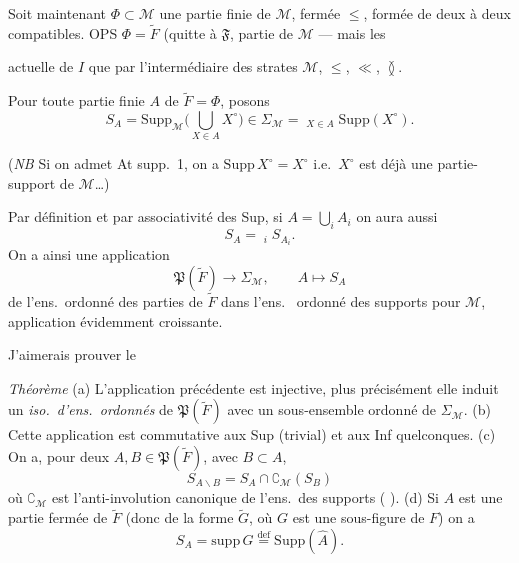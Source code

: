 \documentclass[11pt,a4paper]{article}
\begin{document}
 Soit maintenant $\Phi \subset \mathcal{M}$ \struck{\ill{}} une partie finie de $\mathcal{M}$, fermée  $\leq$, formée de   deux à deux compatibles. OPS $\Phi = \widetilde{F}$ (quitte à \struck{\ill{}} \ill{} $\mathfrak{F}$, \ill{} \ill{} partie de $\mathcal{M}$ — mais les

 \ill{} actuelle \ill{}  de $I$ que par l'intermédiaire des strates $\mathcal{M}$, $\leq$, $\ll$, $\between$. 

Pour toute partie finie $A$ de $\widetilde{F} = \Phi$, posons
\[
  S_A = \mathrm{Supp}_{\mathcal{M}} \Big( \bigcup_{X \in A} X^{\circ} \Big) \in \Sigma_{\mathcal{M}}
  = \mathop{\mathrm{Sup}_{\Sigma_{\mathcal{M}}}}_{X \in A} \mathrm{Supp}(X^{\circ}) .
\]

(\emph{NB} Si on admet At supp.\ 1, on a $\mathrm{Supp}\, X^{\circ} = X^{\circ}$ i.e.\ $X^{\circ}$ est déjà une partie-support de $\mathcal{M}$\ldots)

Par définition et par associativité des Sup, si $A = \bigcup_i A_i$ on aura aussi
\[
  S_A = \mathop{\mathrm{Sup}_{\Sigma_{\mathcal{M}}}}_{i} S_{A_i} .
\]
On a ainsi une application
\[
  \mathfrak{P}(\widetilde{F}) \longrightarrow \Sigma_{\mathcal{M}} , \qquad A \longmapsto S_A
\]
de l'ens.\ ordonné des parties de $\widetilde{F}$ dans l'ens.\ \struck{\ill{}} ordonné des supports pour $\mathcal{M}$, application évidemment croissante.

J'aimerais prouver le

\emph{Théorème} (a) L'application précédente est injective, plus précisément elle induit un \emph{iso.\ d'ens.\ ordonnés} de $\mathfrak{P}(\widetilde{F})$ avec \struck{\ill{}} un sous-ensemble ordonné de $\Sigma_{\mathcal{M}}$. (b) Cette application est commutative aux Sup (trivial) et aux Inf quelconques. (c) On a, pour deux $A, B \in \mathfrak{P}(\widetilde{F})$, avec $B \subset A$,
\[
  S_{A \smallsetminus B} = S_A \cap \complement_{\mathcal{M}}(S_B)
\]
où $\complement_{\mathcal{M}}$ est l'anti-involution canonique de l'ens.\ des supports ( ). (d)  Si $A$ est une partie fermée de $\widetilde{F}$ (donc de la forme $\widetilde{G}$, où $G$ est une sous-figure de $F$) on a
\[
  S_A = \mathrm{supp}\, G \overset{\mathrm{def}}{=} \mathrm{Supp}(\hat{A}) .
\]
\end{document}
